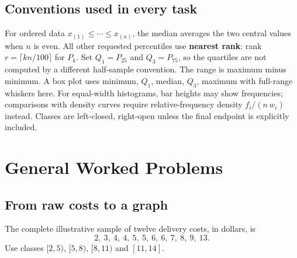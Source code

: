 \subsection{Conventions used in every task}
For ordered data $x_{(1)}\le\cdots\le x_{(n)}$, the median averages the two central values when $n$ is even. All other requested percentiles use \textbf{nearest rank}: rank $r=\lceil kn/100\rceil$ for $P_k$. Set $Q_1=P_{25}$ and $Q_3=P_{75}$, so the quartiles are not computed by a different half-sample convention. The range is maximum minus minimum. A box plot uses minimum, $Q_1$, median, $Q_3$, maximum with full-range whiskers here. For equal-width histograms, bar heights may show frequencies; comparisons with density curves require relative-frequency density $f_i/(n\,w_i)$ instead. Classes are left-closed, right-open unless the final endpoint is explicitly included.
\section{General Worked Problems}\label{sec:general-worked}

\subsection{From raw costs to a graph}\label{prob:sec:general-worked0}
The complete illustrative sample of twelve delivery costs, in dollars, is
\[
2,\ 3,\ 4,\ 4,\ 5,\ 5,\ 6,\ 6,\ 7,\ 8,\ 9,\ 13.
\]
Use classes $[2,5)$, $[5,8)$, $[8,11)$ and $[11,14]$.
